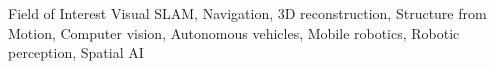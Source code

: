 \begin{rSection}{Field of Interest}
Visual \ac{SLAM}, Navigation, 3D reconstruction, Structure from Motion, Computer vision, Autonomous vehicles, Mobile robotics, Robotic perception, Spatial AI
\end{rSection}

